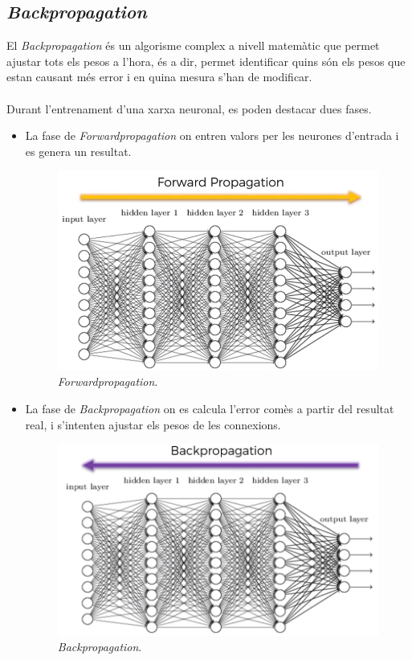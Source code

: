 \documentclass[12pt]{article}
\begin{document}
\clearpage
\subsection{\textit{Backpropagation}\label{bp}}
El \textit{Backpropagation} és un algorisme complex a nivell matemàtic que permet ajustar tots els pesos a l'hora, és a dir, permet identificar quins són els pesos que estan causant més error i en quina mesura s'han de modificar.
\\\\Durant l'entrenament d'una xarxa neuronal, es poden destacar dues fases.
\begin{itemize}
	\item La fase de \textit{Forwardpropagation} on entren valors per les neurones d'entrada i es genera un resultat.
	\begin{figure}[h!]
		\centering
		\includegraphics[scale=0.25]{imatges/bp/1bp.png}
		\caption{\textit{Forwardpropagation}.}
	\end{figure}
	\item La fase de \textit{Backpropagation} on es calcula l'error comès a partir del resultat real, i s'intenten ajustar els pesos de les connexions.
	\begin{figure}[h!]
		\centering
		\includegraphics[scale=0.25]{imatges/bp/2bp.png}
		\caption{\textit{Backpropagation}.}
	\end{figure}
\end{itemize}
\end{document}
